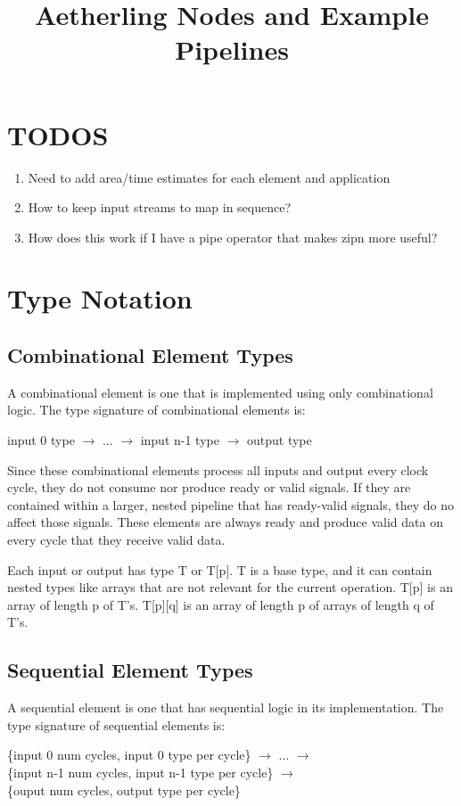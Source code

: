 \documentclass[11pt,fleqn]{article}
\numberwithin{equation}{subsection}
\begin{document}
\title{Aetherling Nodes and Example Pipelines}

\section{TODOS}
\begin{enumerate}
    \item Need to add area/time estimates for each element and application
    \item How to keep input streams to map in sequence?
    \item How does this work if I have a pipe operator that makes zipn more useful?
\end{enumerate}

\section{Type Notation}

\subsection{Combinational Element Types}
A combinational element is one that is implemented using only combinational logic.
The type signature of combinational elements is:
\begin{adjustwidth}{2.5 em}{0 pt}
    input 0 type $\rightarrow$ ... $\rightarrow$ input n-1 type $\rightarrow$ output type
\end{adjustwidth}
Since these combinational elements process all inputs and output every 
clock cycle, they do not consume nor produce ready or valid signals. If they
are contained within a larger, nested pipeline that has ready-valid signals,
they do no affect those signals. These elements are always ready and produce 
valid data on every cycle that they receive valid data.

Each input or output has type T or T[p]. T is a base type, and it can contain 
nested types like arrays that are not relevant for the current operation. T[p] 
is an array of length p of T's. T[p][q] is an array of length p of arrays of 
length q of T's.

\subsection{Sequential Element Types}
A sequential element is one that has sequential logic in its implementation.
The type signature of sequential elements is:
\begin{adjustwidth}{2.5 em}{0 pt}
    \{input 0 num cycles, input 0 type per cycle\} $\rightarrow$ ...
    $\rightarrow$ \\
    \{input n-1 num cycles, input n-1 type per cycle\} $\rightarrow$ \\ 
    \{ouput num cycles, output type per cycle\}
\end{adjustwidth}
\end{document}
